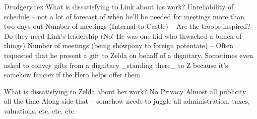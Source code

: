 Drudgery.tex
What is dissatisfying to Link about his work?
    Unreliability of schedule
      -- not a lot of forecast of when he'll be needed for meetings more than two days out
    Number of meetings (Internal to Castle)
      -- Are the troops inspired? Do they need Link's leadership (No! He was one kid who thwacked a bunch of things)
    Number of meetings (being showpony to foreign potentate)
      -- Often requested that he present a gift to Zelda on behalf of a dignitary. Sometimes even asked to convey gifts from a dignitary _standing there_ to Z because it's somehow fancier if the Hero helps offer them.

What is dissatisfying to Zelda about her work?
    No Privacy
    Almost all publicity all the time
    Along side that -- somehow needs to juggle all administration, taxes, valuations, etc. etc. etc.
